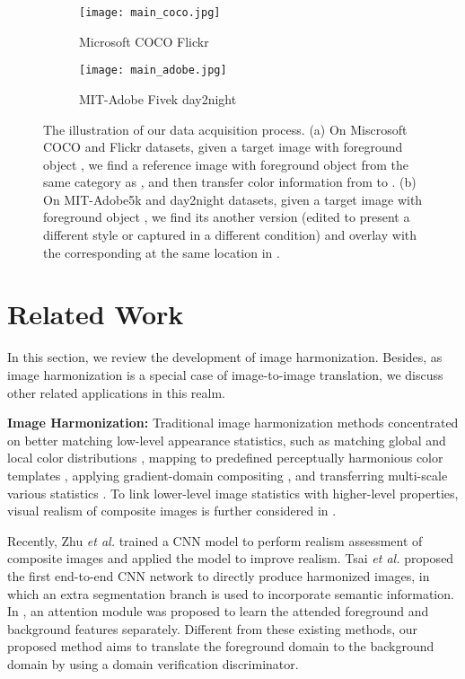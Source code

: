 \documentclass[10pt,twocolumn,letterpaper]{article}
\begin{document}
\begin{figure*}	
	\centering
	\begin{subfigure}[t]{3.2in}
		\centering
		\texttt{[image: main\_coco.jpg]}
		\caption{Microsoft COCO  Flickr}\label{Fig:coco_acq}		
	\end{subfigure}
	\quad
	\begin{subfigure}[t]{3.2in}
		\centering
		\texttt{[image: main\_adobe.jpg]}
		\caption{MIT-Adobe Fivek  day2night}\label{Fig:adobe_acq}
	\end{subfigure}
	\caption{The illustration of our data acquisition process. (a) On Miscrosoft COCO and Flickr datasets, given a target image  with foreground object , we find a reference image  with foreground object  from the same category as , and then transfer color information from  to . (b) On MIT-Adobe5k and day2night datasets, given a target image  with foreground object , we find its another version  (edited to present a different style or captured in a different condition) and overlay  with the corresponding  at the same location in .}\label{fig:data_acq}
\end{figure*}

\section{Related Work}
In this section, we review the development of image harmonization. Besides, as image harmonization is a special case of image-to-image translation, we discuss other related applications in this realm.

\textbf{Image Harmonization: }Traditional image harmonization methods concentrated on better matching low-level appearance statistics, such as matching global and local color distributions \cite{Pitie2005ndimensional,reinhard2001color}, mapping to predefined perceptually harmonious color templates \cite{colorharmonization}, applying gradient-domain compositing \cite{poisson,dragdroppaste,error-tolerant}, and transferring multi-scale various statistics \cite{multi-scale}. To link lower-level image statistics with higher-level properties, visual realism of composite images is further considered in \cite{lalonde2007using,xue2012understanding}. 

Recently, Zhu \emph{et al.} \cite{zhu2015learning} trained a CNN model to perform realism assessment of composite images and applied the model to improve realism. Tsai \emph{et al.} \cite{tsai2017deep} proposed the first end-to-end CNN network to directly produce harmonized images, in which an extra segmentation branch is used to incorporate semantic information. In \cite{xiaodong2019improving}, an attention module was proposed to learn the attended foreground and background features separately. Different from these existing methods, our proposed method aims to translate the foreground domain to the background domain by using a domain verification discriminator.
\end{document}
